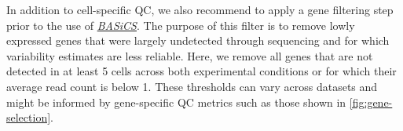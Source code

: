 \documentclass[9pt,a4paper,]{extarticle}
\newenvironment{Shaded}{\begin{snugshade}}{\end{snugshade}}
\newcommand{\CommentTok}[1]{\textcolor[rgb]{0.56,0.35,0.01}{\textit{#1}}}
\newcommand{\DataTypeTok}[1]{\textcolor[rgb]{0.13,0.29,0.53}{#1}}
\newcommand{\DecValTok}[1]{\textcolor[rgb]{0.00,0.00,0.81}{#1}}
\newcommand{\KeywordTok}[1]{\textcolor[rgb]{0.13,0.29,0.53}{\textbf{#1}}}
\newcommand{\NormalTok}[1]{#1}
\newcommand{\OperatorTok}[1]{\textcolor[rgb]{0.81,0.36,0.00}{\textbf{#1}}}
\newcommand{\StringTok}[1]{\textcolor[rgb]{0.31,0.60,0.02}{#1}}
\begin{document}
In addition to cell-specific QC, we also recommend to apply a gene filtering
step prior to the use of \emph{\href{https://bioconductor.org/packages/3.11/BASiCS}{BASiCS}}.
The purpose of this filter is to remove lowly expressed genes that were largely
undetected through sequencing and for which variability estimates are less
reliable.
Here, we remove all genes that are not detected in at least 5 cells across both
experimental conditions or for which their average read count is below 1.
These thresholds can vary across datasets and might be informed by gene-specific
QC metrics such as those shown in \ref{fig:gene-selection}.

\begin{Shaded}
\end{Shaded}
\end{document}
